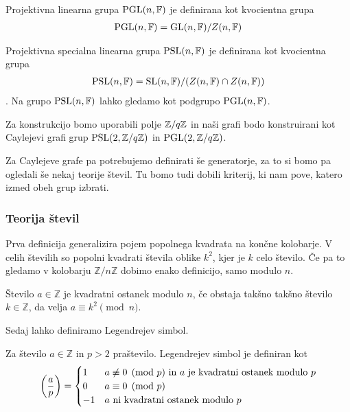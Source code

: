 \begin{definicija}
    Projektivna linearna grupa \(\operatorname{PGL}(n, \mathbb F)\) je definirana kot kvocientna grupa 
    \begin{align*}
        \operatorname{PGL}(n, \mathbb F) = \operatorname{GL}(n, \mathbb F)/Z(n, \mathbb F)
    \end{align*}

    Projektivna specialna linearna grupa \(\operatorname{PSL}(n, \mathbb F)\) je definirana kot kvocientna grupa 
    \begin{align*}
        \operatorname{PSL}(n, \mathbb F) = \operatorname{SL}(n, \mathbb F)/(Z(n, \mathbb F)\cap Z(n, \mathbb F))
    \end{align*}.
    Na grupo \(\operatorname{PSL}(n, \mathbb F)\) lahko gledamo kot podgrupo \(\operatorname{PGL}(n, \mathbb F)\).
\end{definicija}

Za konstrukcijo bomo uporabili polje \(\mathbb Z/q\mathbb Z\) in naši grafi bodo konstruirani kot Caylejevi grafi grup \(\operatorname{PSL}(2, \mathbb Z/q\mathbb Z)\) in \(\operatorname{PGL}(2, \mathbb Z/q\mathbb Z)\).

Za Caylejeve grafe pa potrebujemo definirati še generatorje, za to si bomo pa ogledali še nekaj teorije števil. Tu bomo tudi dobili kriterij, ki nam pove, katero izmed obeh grup izbrati.

\subsubsection{Teorija števil}
Prva definicija generalizira pojem popolnega kvadrata na končne kolobarje. V celih številih so popolni kvadrati števila oblike \(k^2\), kjer je \(k\) celo število. Če pa to gledamo v kolobarju \(\mathbb Z/n\mathbb Z\) dobimo enako definicijo, samo modulo \(n\).
\begin{definicija}
    Število \(a\in \mathbb Z\) je kvadratni ostanek modulo \(n\), če obstaja takšno takšno število \(k\in \mathbb Z\), da velja \(a\equiv k^2 \pmod n\).
\end{definicija}

Sedaj lahko definiramo Legendrejev simbol.
\begin{definicija}
    Za število \(a\in \mathbb Z\) in \(p>2\) praštevilo. Legendrejev simbol je definiran kot
    \begin{align*}
        \left(\frac{a}{p}\right) =
        \begin{cases}
            1  & a \not\equiv 0\pmod p \text{ in } a \text{ je kvadratni ostanek modulo } p \\
            0  & a \equiv 0 \pmod p                                            \\
            -1 & a \text{ ni kvadratni ostanek modulo } p
        \end{cases}
    \end{align*}
\end{definicija}

